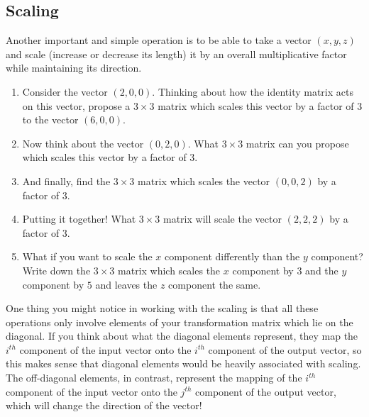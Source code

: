 \documentclass{tufte-handout}
\begin{document}
\subsection{Scaling}  Another important and simple operation is to be able to take a vector $(x,y,z)$ and scale (increase or decrease its length) it by an overall multiplicative factor while maintaining its direction.
\begin{enumerate}[resume]
\item  Consider the vector $(2,0,0)$.  Thinking about how the identity matrix acts on this vector, propose a $3\times 3$ matrix which scales this vector by a factor of $3$ to the vector $(6,0,0)$.
\item  Now think about the vector $(0,2,0)$.  What $3\times 3$ matrix can you propose which scales this vector by a factor of $3$.
\item  And finally, find the $3\times 3$ matrix which scales the vector $(0,0,2)$ by a factor of $3$.
\item  Putting it together!  What $3\times 3$ matrix will scale the vector $(2,2,2)$ by a factor of $3$.
\item  What if you want to scale the $x$ component differently than the $y$ component?  Write down the $3\times 3$ matrix which scales the $x$ component by $3$ and the $y$ component by $5$ and leaves the $z$ component the same.
\end{enumerate}

One thing you might notice in working with the scaling is that all these operations only involve elements of your transformation matrix which lie on the diagonal.  If you think about what the diagonal elements represent, they map the $i^{th}$ component of the input vector onto the $i^{th}$ component of the output vector, so this makes sense that diagonal elements would be heavily associated with scaling.  The off-diagonal elements, in contrast, represent the mapping of the $i^{th}$ component of the input vector onto the $j^{th}$ component of the output vector, which will change the direction of the vector!
\end{document}
